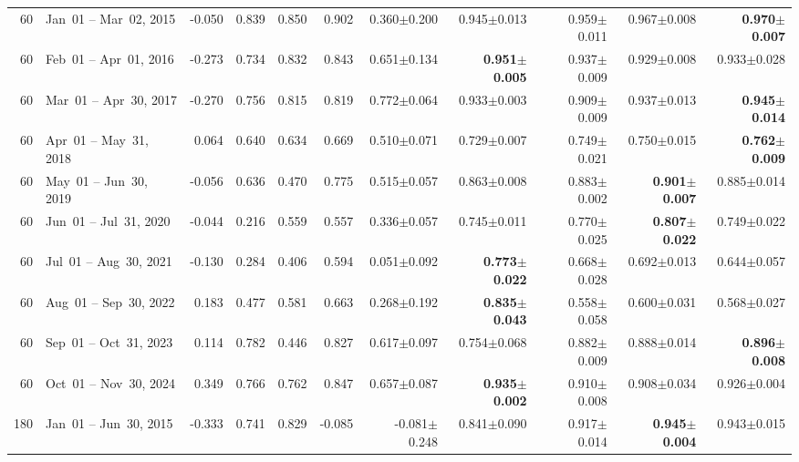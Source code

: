 \begin{longtable}{r l r r r r r r r r r}
60 & Jan~01 -- Mar~02, 2015 & -0.050 & 0.839 & 0.850 & 0.902 & 0.360{\tiny$\pm$0.200} & 0.945{\tiny$\pm$0.013} & 0.959{\tiny$\pm$0.011} & 0.967{\tiny$\pm$0.008} & \textbf{0.970{\tiny$\pm$0.007}} \\
60 & Feb~01 -- Apr~01, 2016 & -0.273 & 0.734 & 0.832 & 0.843 & 0.651{\tiny$\pm$0.134} & \textbf{0.951{\tiny$\pm$0.005}} & 0.937{\tiny$\pm$0.009} & 0.929{\tiny$\pm$0.008} & 0.933{\tiny$\pm$0.028} \\
60 & Mar~01 -- Apr~30, 2017 & -0.270 & 0.756 & 0.815 & 0.819 & 0.772{\tiny$\pm$0.064} & 0.933{\tiny$\pm$0.003} & 0.909{\tiny$\pm$0.009} & 0.937{\tiny$\pm$0.013} & \textbf{0.945{\tiny$\pm$0.014}} \\
60 & Apr~01 -- May~31, 2018 & 0.064 & 0.640 & 0.634 & 0.669 & 0.510{\tiny$\pm$0.071} & 0.729{\tiny$\pm$0.007} & 0.749{\tiny$\pm$0.021} & 0.750{\tiny$\pm$0.015} & \textbf{0.762{\tiny$\pm$0.009}} \\
60 & May~01 -- Jun~30, 2019 & -0.056 & 0.636 & 0.470 & 0.775 & 0.515{\tiny$\pm$0.057} & 0.863{\tiny$\pm$0.008} & 0.883{\tiny$\pm$0.002} & \textbf{0.901{\tiny$\pm$0.007}} & 0.885{\tiny$\pm$0.014} \\
60 & Jun~01 -- Jul~31, 2020 & -0.044 & 0.216 & 0.559 & 0.557 & 0.336{\tiny$\pm$0.057} & 0.745{\tiny$\pm$0.011} & 0.770{\tiny$\pm$0.025} & \textbf{0.807{\tiny$\pm$0.022}} & 0.749{\tiny$\pm$0.022} \\
60 & Jul~01 -- Aug~30, 2021 & -0.130 & 0.284 & 0.406 & 0.594 & 0.051{\tiny$\pm$0.092} & \textbf{0.773{\tiny$\pm$0.022}} & 0.668{\tiny$\pm$0.028} & 0.692{\tiny$\pm$0.013} & 0.644{\tiny$\pm$0.057} \\
60 & Aug~01 -- Sep~30, 2022 & 0.183 & 0.477 & 0.581 & 0.663 & 0.268{\tiny$\pm$0.192} & \textbf{0.835{\tiny$\pm$0.043}} & 0.558{\tiny$\pm$0.058} & 0.600{\tiny$\pm$0.031} & 0.568{\tiny$\pm$0.027} \\
60 & Sep~01 -- Oct~31, 2023 & 0.114 & 0.782 & 0.446 & 0.827 & 0.617{\tiny$\pm$0.097} & 0.754{\tiny$\pm$0.068} & 0.882{\tiny$\pm$0.009} & 0.888{\tiny$\pm$0.014} & \textbf{0.896{\tiny$\pm$0.008}} \\
60 & Oct~01 -- Nov~30, 2024 & 0.349 & 0.766 & 0.762 & 0.847 & 0.657{\tiny$\pm$0.087} & \textbf{0.935{\tiny$\pm$0.002}} & 0.910{\tiny$\pm$0.008} & 0.908{\tiny$\pm$0.034} & 0.926{\tiny$\pm$0.004} \\
\midrule
180 & Jan~01 -- Jun~30, 2015 & -0.333 & 0.741 & 0.829 & -0.085 & -0.081{\tiny$\pm$0.248} & 0.841{\tiny$\pm$0.090} & 0.917{\tiny$\pm$0.014} & \textbf{0.945{\tiny$\pm$0.004}} & 0.943{\tiny$\pm$0.015} \\

\end{longtable}
